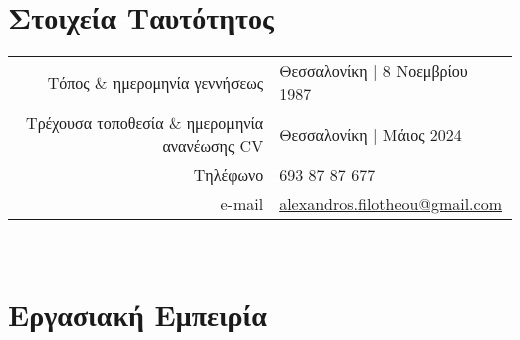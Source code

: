 \documentclass[a4paper,10pt,twoside]{article}
\begin{document}


\par{\bigskip\par}

\section{Στοιχεία Ταυτότητος}

\begin{tabular}{rp{10cm}}
Τόπος $\&$ ημερομηνία γεννήσεως                 & Θεσσαλονίκη | 8 Νοεμβρίου 1987 \\
Τρέχουσα τοποθεσία $\&$ ημερομηνία ανανέωσης CV & Θεσσαλονίκη | Μάιος 2024\\
Τηλέφωνο                                        & 693 87 87 677 \\
e-mail                                          & \href{mailto:alexandros.filotheou@gmail.com}{alexandros.filotheou@gmail.com}
\end{tabular}\\


\section{Εργασιακή Εμπειρία}
\end{document}
